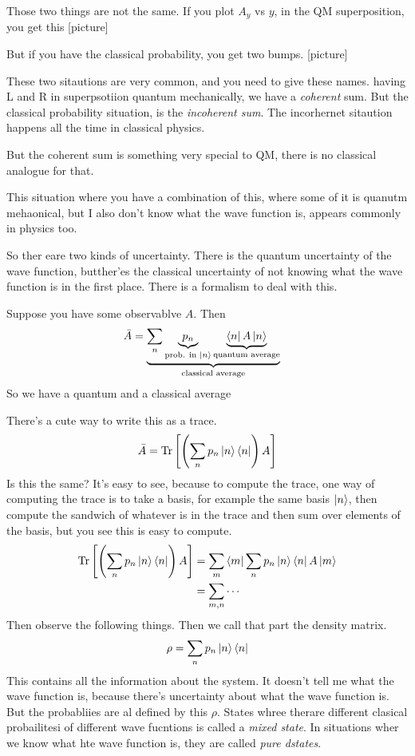 Those two things are not the same.
If you plot $A_y$ vs $y$,
in the QM superposition,
you get this
[picture]

But if you have the classical probability,
you get two bumps.
[picture]

These two sitautions are very common,
and you need to give these names.
having L and R in superpsotiion quantum mechanically,
we have a \emph{coherent} sum.
But the classical probability situation,
is the \emph{incoherent sum}.
The incorhernet sitaution happens all the time
in classical physics.

But the coherent sum is something very special to QM,
there is no classical analogue for that.

This situation where you have a combination of this,
where some of it is quanutm mehaonical,
but I also don't know what the wave function is,
appears commonly in physics too.

So ther eare two kinds of uncertainty.
There is the quantum uncertainty of the wave function,
butther'es the classical uncertainty of not knowing what the wave function is in
the first place.
There is a formalism to deal with this.

Suppose you have some observablve $A$.
Then
\begin{align}
    \bar{A} &=
    \underbrace{
    \sum_n \underbrace{p_n}_{\text{prob. in $\ket{n}$}} \underbrace{\bra{n} A \ket{n}}_{\text{quantum average}}
    }_{\text{classical average}}
\end{align}
So we have a quantum and a classical average

There's a cute way to write this as a trace.
\begin{align}
    \bar{A} = \Tr\left[
    \left( \sum_n p_n \ket{n}\bra{n} \right) A
    \right]
\end{align}
Is this the same?
It's easy to see,
because to compute the trace,
one way of computing the trace is to take a basis,
for example the same basis $\ket{n}$,
then compute the sandwich of whatever is in the trace and then sum over elements
of the basis,
but you see this is easy to compute.
\begin{align}
    \Tr\left[
    \left( \sum_n p_n \ket{n}\bra{n} \right) A
    \right]
    &=
    \sum_{m} \bra{m}
    \sum_n p_n \ket{n}\bra{n} A\ket{m}\\
    &= \sum_{m,n} \cdots
\end{align}
Then observe the following things.
Then we call that part the density matrix.
\begin{align}
    \rho = \sum_n p_n \ket{n}\bra{n}   
\end{align}
This contains all the information about the system.
It doesn't tell me what the wave function is,
because there's uncertainty about what the wave function is.
But the probabliies are al defined by this $\rho$.
States whree therare different clasical probailitesi of different wave fucntions
is called a \emph{mixed state}.
In situations wher we know what hte wave function is,
they are called \emph{pure dstates}.

